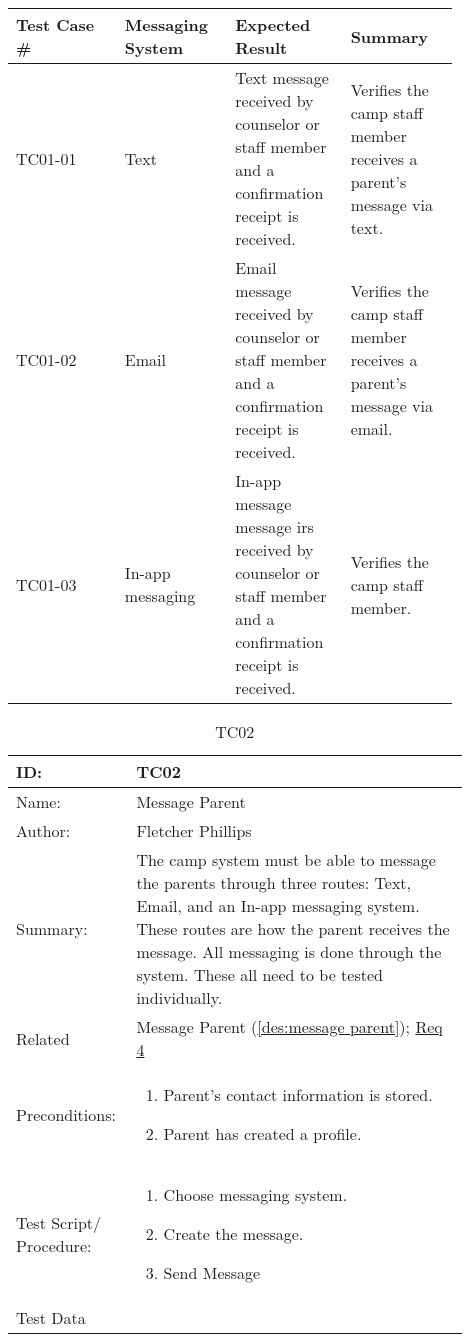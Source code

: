 \documentclass[11pt]{article}
\begin{document}
\begin{center}
\begin{longtable}{|p{0.22\linewidth}|p{0.22\linewidth}|p{0.22\linewidth}|p{0.22\linewidth}|}
	\hline 
	Test Case \# & Messaging System & Expected Result & Summary\\\hline
	TC01-01 & Text & Text message received by counselor or staff member and a confirmation receipt is received. & Verifies the camp staff member receives a parent's message via text.\vspace*{1em}\\\hline
	TC01-02 & Email & Email message received by counselor or staff member and a confirmation receipt is received. & Verifies the camp staff member receives a parent's message via email.\vspace*{1em}\\	\hline
	TC01-03 & In-app messaging & In-app message message irs received by counselor or staff member and a confirmation receipt is received. & Verifies the camp staff member.\vspace*{1em}\\\hline
\end{longtable}
\end{center}
\clearpage


\begin{table}[H]
\begin{center}
\caption{TC02}
\label{TC02}
\begin{tabular}{p{0.20\linewidth}p{0.70\linewidth}}
	ID: & TC02\\\hline
	Name: & Message Parent \\\hline
	Author: & Fletcher Phillips\\\hline
	Summary: &  The camp system must be able to message the parents through three routes: Text, Email, and an In-app messaging system. These routes are how the parent receives the message. All messaging is done through the system. These all need to be tested individually.\\\hline
	Related \hspace{5em} & Message Parent (\cref{des:message parent}); \hyperlink{Req4}{Req 4} \\\hline
	Preconditions:& \begin{enumerate}[topsep=0pt] 
		\item Parent's contact information is stored.
		\item Parent has created a profile.
	\end{enumerate}\\\hline
	Test Script/ Procedure: & \begin{enumerate}[topsep=0pt]
		\item Choose messaging system.
		\item Create the message.
		\item Send Message
	\end{enumerate}\\\hline
	Test Data &
\end{tabular}
\end{center}
\end{table}
\end{document}
